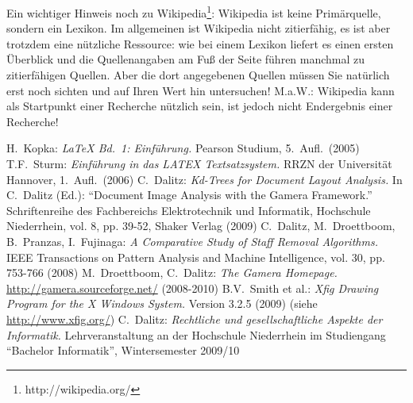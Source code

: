 \documentclass[12pt]{article}
\begin{document}
Ein wichtiger Hinweis noch zu Wikipedia\footnote{http://wikipedia.org/}:
Wikipedia ist keine Primärquelle, sondern ein Lexikon. Im allgemeinen ist
Wikipedia nicht zitierfähig, es ist aber trotzdem eine nützliche Ressource:
wie bei einem Lexikon liefert es einen ersten Überblick und die Quellenangaben
am Fuß der Seite führen manchmal zu zitierfähigen Quellen. Aber die dort
angegebenen Quellen müssen Sie natürlich erst noch sichten und auf Ihren
Wert hin untersuchen! M.a.W.: Wikipedia kann als Startpunkt einer Recherche
nützlich sein, ist jedoch nicht Endergebnis einer Recherche!

\begin{thebibliography}{9}
\raggedright
{} H.~Kopka: {\em LaTeX Bd.~1: Einführung.}
  Pearson Studium, 5.~Aufl.~(2005)
 T.F.~Sturm: {\em Einführung in das LATEX Textsatzsystem.}
  RRZN der Universität Hannover, 1.~Aufl.~(2006)
 C.~Dalitz: {\em Kd-Trees for Document Layout Analysis.}
  In C.~Dalitz (Ed.): ``Document Image Analysis with the Gamera Framework.''
  Schriftenreihe des Fachbereichs Elektrotechnik und Informatik,
  Hochschule Niederrhein, vol. 8, pp. 39-52, Shaker Verlag (2009) 
 C.~Dalitz, M.~Droettboom, B.~Pranzas, I.~Fujinaga:
  {\em A Comparative Study of Staff Removal Algorithms.}
  IEEE Transactions on Pattern Analysis and Machine Intelligence, vol. 30,
  pp. 753-766 (2008)
 M.~Droettboom, C.~Dalitz: {\em The Gamera Homepage.}
  \url{http://gamera.sourceforge.net/} (2008-2010)
 B.V.~Smith et al.: 
  {\em Xfig Drawing Program for the X Windows System.} Version 3.2.5 (2009)
  (siehe \url{http://www.xfig.org/})
 C.~Dalitz: {\em Rechtliche und gesellschaftliche Aspekte der
  Informatik.} Lehrveranstaltung an der Hochschule Niederrhein im Studiengang
  ``Bachelor Informatik'', Wintersemester 2009/10
\end{thebibliography}
\end{document}
